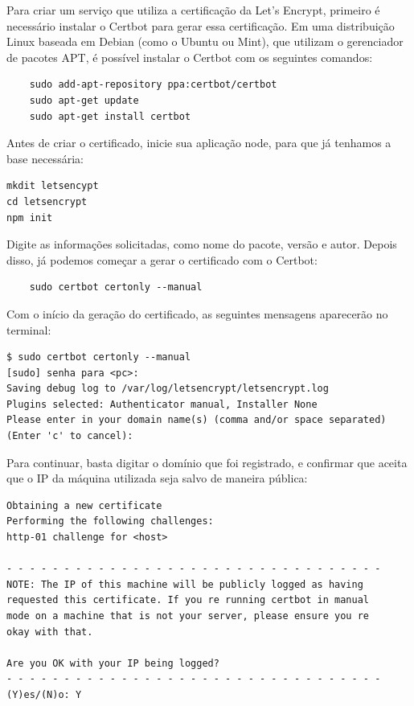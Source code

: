 \documentclass{article}
\begin{document}
Para criar um serviço que utiliza a certificação da Let's Encrypt, primeiro é necessário instalar o Certbot para gerar essa certificação. Em uma distribuição Linux baseada em Debian (como o Ubuntu ou Mint), que utilizam o gerenciador de pacotes APT, é possível instalar o Certbot com os seguintes comandos:

\begin{verbatim}
    sudo add-apt-repository ppa:certbot/certbot
    sudo apt-get update
    sudo apt-get install certbot
\end{verbatim}

Antes de criar o certificado, inicie sua aplicação node, para que já tenhamos a base necessária:

\begin{verbatim}
mkdit letsencypt
cd letsencrypt
npm init
\end{verbatim}

Digite as informações solicitadas, como nome do pacote, versão e autor. Depois disso, já podemos começar a gerar o certificado com o Certbot:

\begin{verbatim}
    sudo certbot certonly --manual
\end{verbatim}

Com o início da geração do certificado, as seguintes mensagens aparecerão no terminal:

\begin{verbatim}
$ sudo certbot certonly --manual
[sudo] senha para <pc>: 
Saving debug log to /var/log/letsencrypt/letsencrypt.log
Plugins selected: Authenticator manual, Installer None
Please enter in your domain name(s) (comma and/or space separated)
(Enter 'c' to cancel): 
\end{verbatim}

Para continuar, basta digitar o domínio que foi registrado, e confirmar que aceita que o IP da máquina utilizada seja salvo de maneira pública:

\begin{verbatim}
Obtaining a new certificate
Performing the following challenges:
http-01 challenge for <host>

- - - - - - - - - - - - - - - - - - - - - - - - - - - - - - - - -
NOTE: The IP of this machine will be publicly logged as having
requested this certificate. If you re running certbot in manual
mode on a machine that is not your server, please ensure you re 
okay with that.

Are you OK with your IP being logged?
- - - - - - - - - - - - - - - - - - - - - - - - - - - - - - - - - 
(Y)es/(N)o: Y
\end{verbatim}
\end{document}
